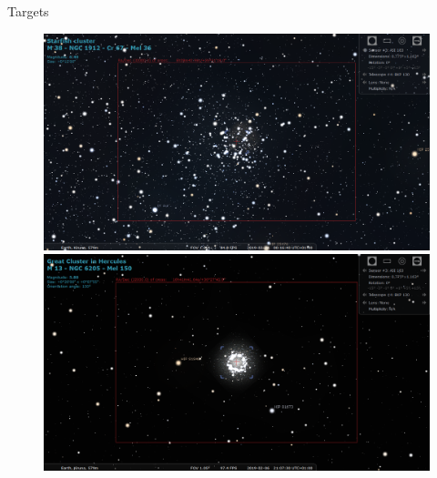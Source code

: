 \documentclass[11pt, aspectratio=169]{beamer}
\begin{document}
\begin{frame}{Targets}
\begin{figure}[!htb]
    \begin{minipage}[t]{.42\textwidth}
        \centering
        \includegraphics[width=\linewidth]{figures/targets/Starfish.png}
    \end{minipage}%
    \begin{minipage}[t]{.42\textwidth}
        \centering
        \includegraphics[width=\linewidth]{figures/targets/Hercules.png}
    \end{minipage}%
\end{figure}
\end{frame}
\end{document}
